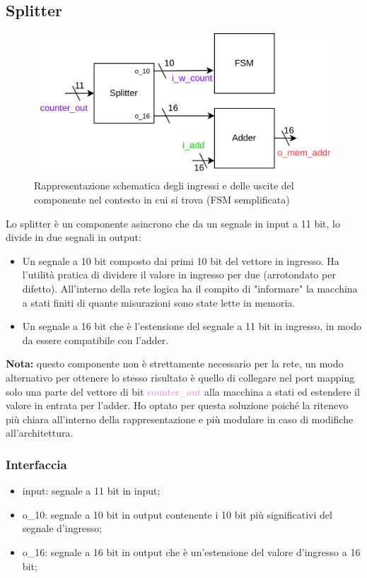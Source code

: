 \documentclass[12pt,a4paper]{scrartcl}
\begin{document}
    \subsection{Splitter}
        \begin{figure}[H]
            \centering
            \includegraphics[width=\linewidth]{schema-splitter.drawio.png}
            \caption{Rappresentazione schematica degli ingressi e delle uscite del componente nel contesto in cui si trova (FSM semplificata)}
            \label{fig:componente}
        \end{figure}
    Lo splitter è un componente asincrono che da un segnale in input a 11 bit, lo divide in due segnali in output:
    \begin{itemize}
        \item Un segnale a 10 bit composto dai primi 10 bit del vettore in ingresso. Ha l'utilità pratica di dividere il valore in ingresso per due (arrotondato per difetto). \newline All'interno della rete logica ha il compito di "informare" la macchina a stati finiti di quante misurazioni sono state lette in memoria.
        \item Un segnale a 16 bit che è l'estensione del segnale a 11 bit in ingresso, in modo da essere compatibile con l'adder.
    \end{itemize}
    \textbf{Nota:} questo componente non è strettamente necessario per la rete, un modo alternativo per ottenere lo stesso risultato è quello di collegare nel port mapping solo una parte del vettore di bit \textcolor{violet}{counter\_out} alla macchina a stati ed estendere il valore in entrata per l'adder.
    \newline Ho optato per questa soluzione poiché la ritenevo più chiara all'interno della rappresentazione e più modulare in caso di modifiche all'architettura.
    \subsubsection{Interfaccia}
        \begin{itemize}
            \item input: segnale a 11 bit in input;
            \item o\_10: segnale a 10 bit in output contenente i 10 bit più significativi del segnale d'ingresso;
            \item o\_16: segnale a 16 bit in output che è un'estensione del valore d'ingresso a 16 bit; 
        \end{itemize}
\end{document}
